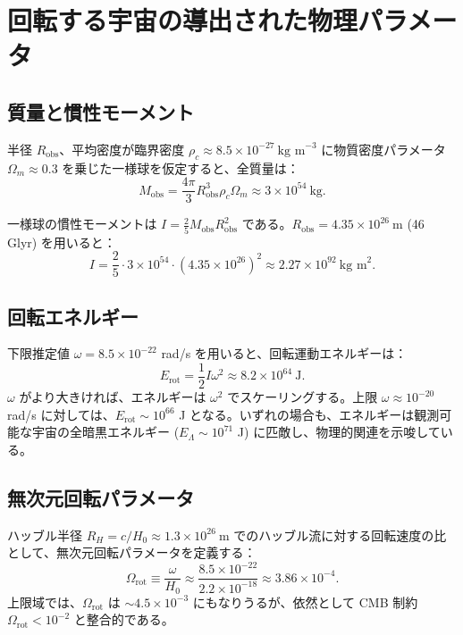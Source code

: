 \documentclass[11pt,a4paper]{article}
\newcommand{\Omegarot}{\Omega_{\mathrm{rot}}}
\begin{document}
	\section{回転する宇宙の導出された物理パラメータ}
	
	\subsection{質量と慣性モーメント}
	
	半径 \(R_{\text{obs}}\)、平均密度が臨界密度 \(\rho_c \approx 8.5\times10^{-27}\ \text{kg m}^{-3}\) に物質密度パラメータ \(\Omega_m \approx 0.3\) を乗じた一様球を仮定すると、全質量は：
	\begin{equation}
		M_{\text{obs}} = \frac{4\pi}{3} R_{\text{obs}}^3 \rho_c \Omega_m \approx 3 \times 10^{54}\ \text{kg}.
	\end{equation}
	
	一様球の慣性モーメントは \(I = \frac{2}{5} M_{\text{obs}} R_{\text{obs}}^2\) である。\(R_{\text{obs}} = 4.35\times10^{26}\ \text{m}\) (46 Glyr) を用いると：
	\begin{equation}
		I = \frac{2}{5} \cdot 3\times10^{54} \cdot (4.35\times10^{26})^2 \approx 2.27 \times 10^{92}\ \text{kg m}^2.
	\end{equation}
	
	\subsection{回転エネルギー}
	
	下限推定値 \(\omega = 8.5\times10^{-22}\) rad/s を用いると、回転運動エネルギーは：
	\begin{equation}
		E_{\text{rot}} = \frac{1}{2} I \omega^2 \approx 8.2 \times 10^{64}\ \text{J}.
	\end{equation}
	\(\omega\) がより大きければ、エネルギーは \(\omega^2\) でスケーリングする。上限 \(\omega \approx 10^{-20}\) rad/s に対しては、\(E_{\text{rot}} \sim 10^{66}\) J となる。いずれの場合も、エネルギーは観測可能な宇宙の全暗黒エネルギー (\(E_{\Lambda} \sim 10^{71}\) J) に匹敵し、物理的関連を示唆している。
	
	\subsection{無次元回転パラメータ}
	
	ハッブル半径 \(R_H = c/H_0 \approx 1.3\times10^{26}\ \text{m}\) でのハッブル流に対する回転速度の比として、無次元回転パラメータを定義する：
	\begin{equation}
		\Omegarot \equiv \frac{\omega}{H_0} \approx \frac{8.5\times10^{-22}}{2.2\times10^{-18}} \approx 3.86\times10^{-4}.
	\end{equation}
	上限域では、\(\Omegarot\) は \(\sim 4.5\times10^{-3}\) にもなりうるが、依然として CMB 制約 \(\Omegarot < 10^{-2}\) と整合的である。
	
\end{document}
